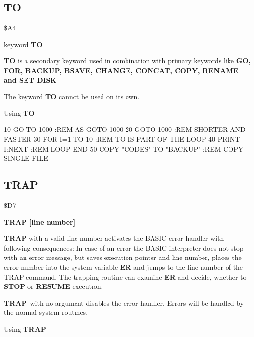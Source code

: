 \subsection{TO}
\begin{description}[leftmargin=3cm,style=nextline]
\item [Token:] \$A4
\item [Format:] keyword {\bf TO}
\item [Usage:]  {\bf TO} is a secondary keyword used in
                combination with primary keywords like
                {\bf GO, FOR, BACKUP, BSAVE, CHANGE, CONCAT, COPY,
                RENAME and SET DISK}

\item [Remarks:] The keyword {\bf TO} cannot be used on its own.

\item [Example:] Using {\bf TO}

\begin{screenoutput}
10 GO TO 1000    :REM AS GOTO 1000
20 GOTO 1000     :REM SHORTER AND FASTER
30 FOR I=1 TO 10 :REM TO IS PART OF THE LOOP
40 PRINT I:NEXT  :REM LOOP END
50 COPY "CODES" TO "BACKUP" :REM COPY SINGLE FILE
\end{screenoutput}
\end{description}


\newpage
\subsection{TRAP}
\begin{description}[leftmargin=3cm,style=nextline]
\item [Token:] \$D7
\item [Format:] {\bf TRAP [line number]}
\item [Usage:]  {\bf TRAP} with a valid line number activates the
                BASIC error handler with following consequences:
                In case of an error the BASIC interpreter does not
                stop with an error message, but saves execution
                pointer and line number, places the error number into the
                system variable {\bf ER} and jumps to the line number
                of the TRAP command. The trapping routine can examine
                {\bf ER} and decide, whether to {\bf STOP}
                 or {\bf RESUME} execution.

                {\bf TRAP} with no argument disables the error handler.
                Errors will be handled by the normal system routines.

\item [Example:] Using {\bf TRAP}
\end{description}

